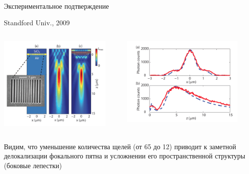\documentclass[9pt, compress, xcolor=table]{beamer}
\begin{document}
\begin{frame}{Экспериментальное подтверждение}

Standford Univ., 2009

\begin{columns}[c]
\column{6.5cm}
\begin{center}
\includegraphics[width=0.9\textwidth]{ns5}
\end{center}
\column{6.5cm}
\begin{center}
\includegraphics[width=0.9\textwidth]{ns6}
\end{center}
\end{columns}
Видим, что уменьшение количества щелей (от 65 до 12) приводит к заметной делокализации фокального пятна и усложнении его пространственной структуры (боковые лепестки)

\end{frame}
\end{document}
